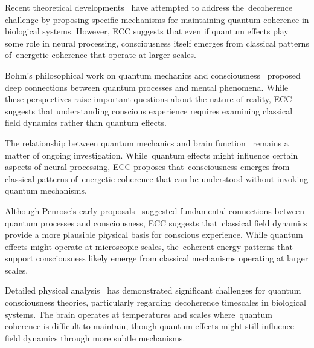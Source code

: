 Recent theoretical developments~\cite{Hagan2002, freeman2006nonlinear} have attempted to address the~decoherence challenge by proposing specific mechanisms for maintaining quantum coherence in biological systems. However, ECC suggests that even if quantum effects play some role in neural processing, consciousness itself emerges from classical patterns of~energetic coherence that operate at larger scales.

Bohm's philosophical work on quantum mechanics and consciousness~\cite{Bohm1990} proposed deep connections between quantum processes and mental phenomena. While these perspectives raise important questions about the nature of reality, ECC suggests that understanding conscious experience requires examining classical field dynamics rather than quantum effects.

The relationship between quantum mechanics and brain function~\cite{Koch2006, hales2022electromagnetism} remains a matter of ongoing investigation. While~quantum effects might influence certain aspects of neural processing, ECC proposes that~consciousness emerges from classical patterns of~energetic coherence that can be understood without invoking quantum mechanisms.

Although Penrose's early proposals~\cite{Penrose1989, Penrose1994} suggested fundamental connections between quantum processes and consciousness, ECC suggests that~classical field dynamics provide a more plausible physical basis for conscious experience. While quantum effects might operate at microscopic scales, the~coherent energy patterns that support consciousness likely emerge from classical mechanisms operating at larger scales.

Detailed physical analysis~\cite{Tegmark2000, anderson2024physical} has demonstrated significant challenges for quantum consciousness theories, particularly regarding decoherence timescales in biological systems. The brain operates at temperatures and scales where~quantum coherence is difficult to maintain, though quantum effects might still influence field dynamics through more subtle mechanisms.

